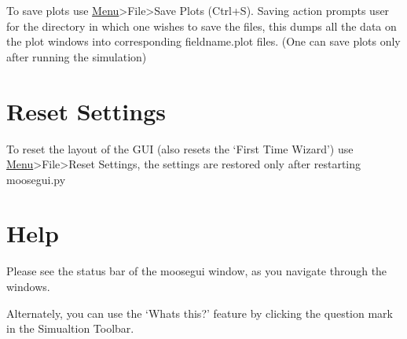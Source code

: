 \documentclass[11pt]{article}
\begin{document}
  To save plots use \hyperref[sec-2]{Menu}>File>Save Plots (Ctrl+S). Saving action prompts user for the directory in which one wishes to save the files, this dumps all the data on the plot windows into corresponding fieldname.plot files. (One can save plots only after running the simulation)


\section{Reset Settings}
\label{sec-7}


  To reset the layout of the GUI (also resets the `First Time Wizard') use \hyperref[sec-2]{Menu}>File>Reset Settings, the settings are restored only after restarting moosegui.py


\section{Help}
\label{sec-8}


  Please see the status bar of the moosegui window, as you navigate through the windows. 

  Alternately, you can use the `Whats this?' feature by clicking the question mark in the Simualtion Toolbar.
\end{document}

